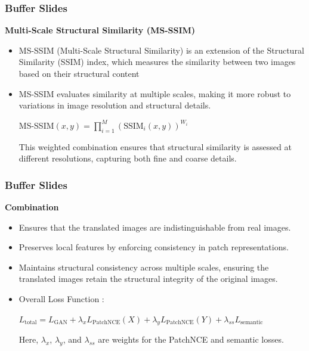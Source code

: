 \documentclass[aspectratio=169, lecture, amberg]{OTHAWbeamer}
\begin{document}
\begin{frame}
    \frametitle{Buffer Slides}
    \textbf{Multi-Scale Structural Similarity (MS-SSIM)}
    \begin{itemize}
        \item MS-SSIM (Multi-Scale Structural Similarity) is an extension of the Structural Similarity (SSIM) index, which measures the similarity between two images based on their structural content
        \item MS-SSIM evaluates similarity at multiple scales, making it more robust to variations in image resolution and structural details.
        \begin{block}{}
            \begin{center}
            MS-SSIM$(x, y) = \prod_{i=1}^{M} (\text{SSIM}_i(x, y))^{W_i}$
            \end{center}
            \end{block}
            This weighted combination ensures that structural similarity is assessed at different resolutions, capturing both fine and coarse details.

    \end{itemize}
    
\end{frame}

\begin{frame}
    \frametitle{Buffer Slides}
    \textbf{Combination}
    \begin{itemize}
        \item Ensures that the translated images are indistinguishable from real images.
        \item Preserves local features by enforcing consistency in patch representations.
        \item Maintains structural consistency across multiple scales, ensuring the translated images retain the structural integrity of the original images.
        \item Overall Loss Function :
        
\begin{block}{}
    \begin{center}
    $L_{\text{total}} = L_{\text{GAN}} + \lambda_x L_{\text{PatchNCE}}(X) + \lambda_y L_{\text{PatchNCE}}(Y) + \lambda_{ss} L_{\text{semantic}}$
    \end{center}
    \end{block}
    Here, $\lambda_x$, $\lambda_y$, and $\lambda_{ss}$ are weights for the PatchNCE and semantic losses.

        
    \end{itemize}
    
\end{frame}
\end{document}
